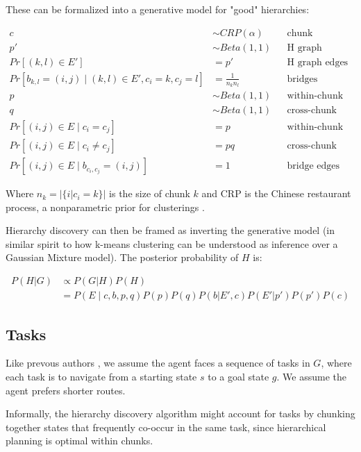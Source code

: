\documentclass[11pt]{article}
\begin{document}
These can be formalized into a generative model for "good" hierarchies:

\begin{align*}
    c &\sim CRP(\alpha)  		&& \text{chunk assignments} \\
    p' &\sim Beta(1,1)   		&& \text{H graph density} \\
    Pr[(k,l) \in E'] &= p'      && \text{H graph edges} \\
    Pr[b_{k,l} = (i,j) \mid (k,l) \in E', c_i = k, c_j = l] &= \frac{1}{n_k n_l}   && \text{bridges}  \\
    p &\sim Beta(1,1)  		&& \text{within-chunk density} \\
    q &\sim Beta(1,1)  		&& \text{cross-chunk density penalty} \\
    Pr[(i,j) \in E \mid c_i = c_j] &= p    && \text{within-chunk edges} \\
    Pr[(i,j) \in E \mid c_i \ne c_j] &= pq    && \text{cross-chunk edges} \\
    Pr[(i,j) \in E \mid b_{c_i,c_j} = (i,j)] &= 1    && \text{bridge edges} 
\end{align*}

Where $n_k = |\{ i | c_i=k \}|$ is the size of chunk $k$ and CRP is the Chinese restaurant process, a nonparametric prior for clusterings \cite{gershman2012tutorial}. 

Hierarchy discovery can then be framed as inverting the generative model (in similar spirit to how k-means clustering can be understood as inference over a Gaussian Mixture model). The posterior probability of $H$ is:

\begin{align}
\label{eq:post}
    P(H|G) &\propto P(G|H) P(H) \\
    &= P(E \mid c,b,p,q) P(p) P(q) P(b|E',c) P(E'|p') P(p') P(c)
\end{align}


\subsection{Tasks}

Like prevous authors \cite{Solway2014, balaguer2016neural}, we assume the agent faces a sequence of tasks in $G$, where each task is to navigate from a starting state $s$ to a goal state $g$. We assume the agent prefers shorter routes.

Informally, the hierarchy discovery algorithm might account for tasks by chunking together states that frequently co-occur in the same task, since hierarchical planning is optimal within chunks. 
\end{document}
